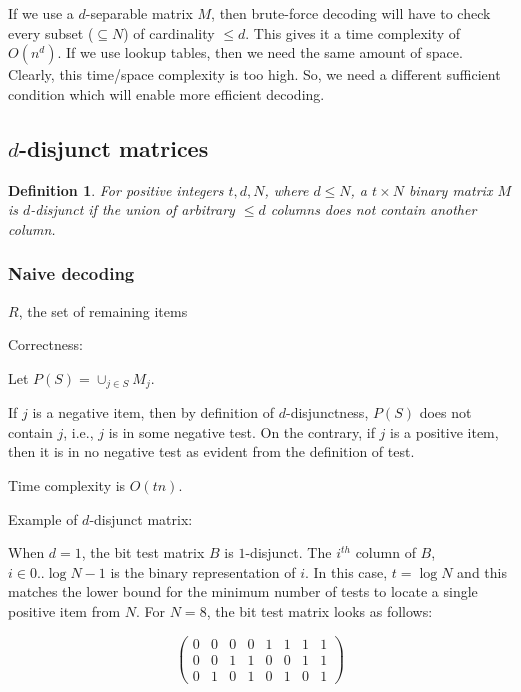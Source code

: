 \documentclass{article}
\newtheorem{definition}{Definition}
\begin{document}
If we use a $d$-separable matrix $M$, then brute-force decoding will have to check
every subset ($\subseteq N$) of cardinality $\le d$. This gives it a time complexity
of $O(n^d)$. If we use lookup tables, then we need the same amount of space. Clearly,
this time/space complexity is too high. So, we need a different sufficient condition
which will enable more efficient decoding.

\subsection{$d$-disjunct matrices}

\begin{definition}
  For positive integers $t,d,N$, where $d \le N$, a $t \times N$ binary matrix $M$
  is $d$-disjunct\cite{rudra709} if the union of arbitrary $\le d$ columns does not
  contain another column.
\end{definition}

\subsubsection{Naive decoding}

\begin{algorithm}
  \Return $R$, the set of remaining items
\end{algorithm}

Correctness:

Let $P(S) = \cup_{j \in S}M_j$.

If $j$ is a negative item, then by definition of $d$-disjunctness,
$P(S)$ does not contain $j$, i.e., $j$ is in some negative test.
On the contrary, if $j$ is a positive item, then it is in no negative
test as evident from the definition of test.

Time complexity is $O(tn)$.

Example of $d$-disjunct matrix:

When $d = 1$, the bit test matrix $B$ is $1$-disjunct. The $i^{th}$ column
of $B$, $i \in {0..\log{N}-1}$ is the binary representation of $i$. In this
case, $t = \log{N}$ and this matches the lower bound for the minimum number of
tests to locate a single positive item from $N$. For $N = 8$, the bit test matrix
looks as follows:

$$\begin{pmatrix}
  0 & 0 & 0 & 0 & 1 & 1 & 1 & 1 \\
  0 & 0 & 1 & 1 & 0 & 0 & 1 & 1 \\
  0 & 1 & 0 & 1 & 0 & 1 & 0 & 1
\end{pmatrix}$$
\end{document}
